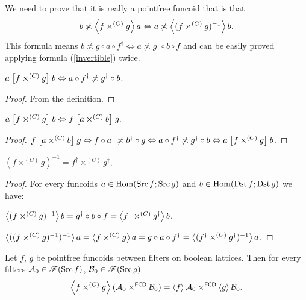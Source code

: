 We need to prove that it is really a pointfree funcoid that is that
\[
b\not\asymp\left\langle f\times^{(C)}g\right\rangle a\Leftrightarrow a\not\asymp\left\langle (f\times^{(C)}g)^{-1}\right\rangle b.
\]
This formula means $b\nasymp g\circ a\circ f^{\dagger}\Leftrightarrow a\nasymp g^{\dagger}\circ b\circ f$
and can be easily proved applying formula (\ref{invertible})
twice.
\begin{prop}
$a\mathrel{\left[f\times^{(C)}g\right]}b\Leftrightarrow a\circ f^{\dagger}\not\asymp g^{\dagger}\circ b$.\end{prop}
\begin{proof}
From the definition.\end{proof}
\begin{prop}
$a\mathrel{\left[f\times^{(C)}g\right]}b\Leftrightarrow f\mathrel{\left[a\times^{(C)}b\right]}g$.\end{prop}
\begin{proof}
$f\mathrel{\left[a\times^{(C)}b\right]}g\Leftrightarrow f\circ a^{\dagger}\not\asymp b^{\dagger}\circ g\Leftrightarrow a\circ f^{\dagger}\not\asymp g^{\dagger}\circ b\Leftrightarrow a\mathrel{\left[f\times^{(C)}g\right]}b$.\end{proof}
\begin{thm}
$(f\times^{(C)}g)^{-1}=f^{\dagger}\times^{(C)}g^{\dagger}$.\end{thm}
\begin{proof}
For every funcoids $a\in\operatorname{Hom}(\operatorname{Src} f;\operatorname{Src} g)$ and $b\in\operatorname{Hom}(\operatorname{Dst} f;\operatorname{Dst} g)$
we have:

$\left\langle (f\times^{(C)}g)^{-1}\right\rangle b=g^{\dagger}\circ b\circ f=\left\langle f^{\dagger}\times^{(C)}g^{\dagger}\right\rangle b$.

$\left\langle ((f\times^{(C)}g)^{-1})^{-1}\right\rangle a=\left\langle f\times^{(C)}g\right\rangle a=g\circ a\circ f^{\dagger}=\left\langle (f^{\dagger}\times^{(C)}g^{\dagger})^{-1}\right\rangle a$.
\end{proof}
\begin{thm}
Let $f$, $g$ be pointfree funcoids between filters on boolean lattices.
Then for every filters $\mathcal{A}_{0}\in\mathscr{F}(\operatorname{Src} f)$, $\mathcal{B}_{0}\in\mathscr{F}(\operatorname{Src} g)$
\[
\left\langle f\times^{(C)}g\right\rangle(\mathcal{A}_{0}\times^{\mathsf{FCD}}\mathcal{B}_{0})=\left\langle f\right\rangle\mathcal{A}_{0}\times^{\mathsf{FCD}}\left\langle g\right\rangle\mathcal{B}_{0}.
\]
\end{thm}
